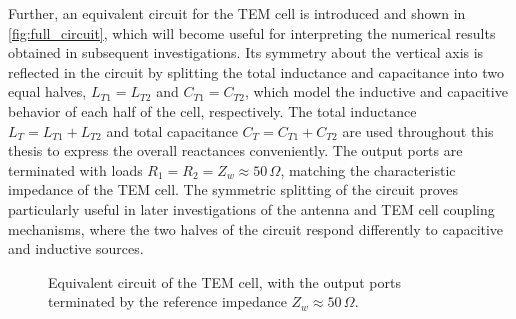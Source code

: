 Further, an equivalent circuit for the TEM cell is introduced and shown in 
\autoref{fig:full_circuit}, which will become useful for interpreting the numerical 
results obtained in subsequent investigations. Its symmetry about the vertical axis is reflected in the circuit 
by splitting the total inductance and capacitance into two equal halves, 
$L_{T1} = L_{T2}$ and $C_{T1} = C_{T2}$, which model the inductive and capacitive 
behavior of each half of the cell, respectively. The total inductance 
$L_T = L_{T1} + L_{T2}$ and total capacitance $C_T = C_{T1} + C_{T2}$ are used 
throughout this thesis to express the overall reactances conveniently. The output 
ports are terminated with loads $R_1 = R_2 = Z_w \approx 50\,\Omega$, matching the 
characteristic impedance of the TEM cell. The symmetric splitting of the circuit 
proves particularly useful in later investigations of the antenna and TEM cell coupling 
mechanisms, where the two halves of the circuit respond differently to capacitive 
and inductive sources.

\begin{figure}[htbp]
	\centering
	\caption{Equivalent circuit of the TEM cell, with the output ports terminated 
		by the reference impedance $Z_w \approx 50\,\Omega$.}
	\label{fig:full_circuit}
\end{figure}

